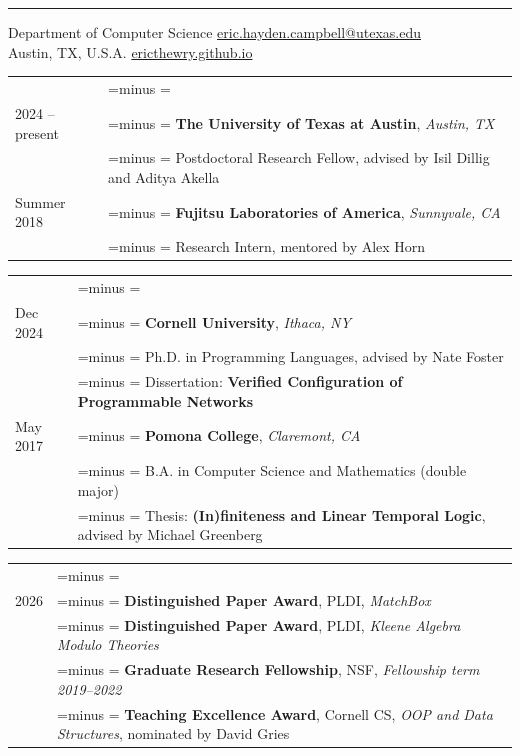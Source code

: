 \documentclass[letterpaper,10pt,oneside]{article}
\makeatletter
\newlength{\leftcol}  \setlength{\leftcol}{1.05in}
\newlength{\colsep}   \setlength{\colsep}{1em}
\newlength{\rightcol}
\newcommand{\balancedrag}{%
  \setlength{\rightskip}{0pt plus 0.45\rightcol}%
  \setlength{\parfillskip}{0pt}%
  \spaceskip=\fontdimen2\font minus \fontdimen4\font
  \xspaceskip=\spaceskip
  \hbadness=10000 \hyphenpenalty=10000 \exhyphenpenalty=10000 \emergencystretch=0pt}
\newenvironment{cvsection}[1]
  {\par\vspace{0.9em}%
   \setlength{\rightcol}{\dimexpr\linewidth-\leftcol-\colsep\relax}%
   \noindent\begin{longtable}[l]{@{}>{\raggedleft\arraybackslash}p{\leftcol}@{\hspace{\colsep}}>{\raggedright\balancedrag\arraybackslash}p{\rightcol}@{}}
   \multicolumn{2}{@{}l}{\Large #1} \\*\noalign{\nobreak\vspace{0.4em}}}
  {\end{longtable}}
\newcommand{\gap}{\noalign{\vspace{0.4em}}}
\makeatother
\begin{document}

 \\[0.4em]
 \\[-1.5ex]
\hrule
\vspace{0.6em}
\noindent Department of Computer Science
\hfill \href{mailto:eric.hayden.campbell@utexas.edu}{eric.hayden.campbell@utexas.edu} \\
\noindent Austin, TX, U.S.A.
\hfill \href{https://ericthewry.github.io}{ericthewry.github.io}


\begin{cvsection}{Research Positions}
  2024 -- present & \textbf{The University of Texas at Austin}, \textit{Austin, TX} \\*
  & Postdoctoral Research Fellow, advised by Isil Dillig and Aditya Akella \\
  \gap
  Summer 2018 & \textbf{Fujitsu Laboratories of America}, \textit{Sunnyvale, CA} \\*
  & Research Intern, mentored by Alex Horn \\
\end{cvsection}


\begin{cvsection}{Education}
  Dec 2024 & \textbf{Cornell University}, \textit{Ithaca, NY} \\*
  & Ph.D. in Programming Languages, advised by Nate Foster \\*
  & Dissertation: \textbf{Verified Configuration of Programmable Networks} \\
  \gap
  May 2017 & \textbf{Pomona College}, \textit{Claremont, CA} \\*
  & B.A. in Computer Science and Mathematics (double major) \\*
  & Thesis: \textbf{(In)finiteness and Linear Temporal Logic}, advised by Michael Greenberg \\
\end{cvsection}


\begin{cvsection}{Awards \& Honors}
  2026 & \textbf{Distinguished Paper Award}, PLDI, \textit{MatchBox} \\
  2022 & \textbf{Distinguished Paper Award}, PLDI, \textit{Kleene Algebra Modulo Theories} \\
  2019 & \textbf{Graduate Research Fellowship}, NSF, \textit{Fellowship term 2019--2022} \\
  2018 & \textbf{Teaching Excellence Award}, Cornell CS, \textit{OOP and Data Structures}, nominated by David Gries \\
\end{cvsection}
\end{document}
